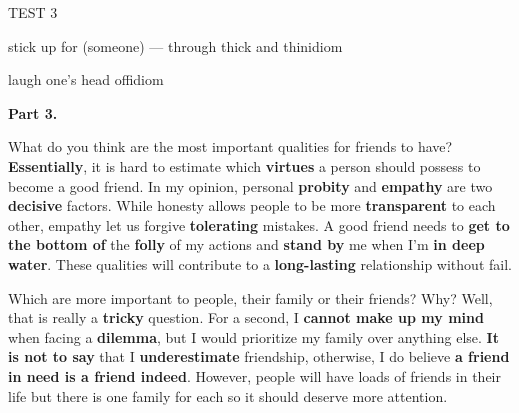 \begin{glossarymc}[Cambridge 5]
\begin{test}{TEST 3}
\begin{VocabExplain}[Part 2]
            \begin{ExplainCard}{stick up for (someone) — through thick and thin}{idiom}
            \end{ExplainCard}

            \begin{ExplainCard}{laugh one’s head off}{idiom}
            \end{ExplainCard}
        \end{VocabExplain}

    \noindent
    \textbf{Part 3.}
    \begin{qa}{What do you think are the most important qualities for friends to have?}
        \textbf{Essentially}, it is hard to estimate which \textbf{virtues} a person should possess to become a good friend. In my opinion, personal \textbf{probity} and \textbf{empathy} are two \textbf{decisive} factors. While honesty allows people to be more \textbf{transparent} to each other, empathy let us forgive \textbf{tolerating} mistakes. A good friend needs to \textbf{get to the bottom of} the \textbf{folly} of my actions and \textbf{stand by} me when I’m \textbf{in deep water}. These qualities will contribute to a \textbf{long-lasting} relationship without fail.
    \end{qa}

    \begin{qa}{Which are more important to people, their family or their friends? Why?}
        Well, that is really a \textbf{tricky} question. For a second, I \textbf{cannot make up my mind} when facing a \textbf{dilemma}, but I would prioritize my family over anything else. \textbf{It is not to say} that I \textbf{underestimate} friendship, otherwise, I do believe \textbf{a friend in need is a friend indeed}. However, people will have loads of friends in their life but there is one family for each so it should deserve more attention.
    \end{qa}


\end{test}
\end{glossarymc}
